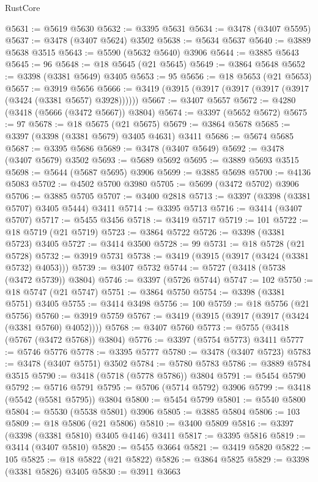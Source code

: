 \begin{lexlean}{RustCore}
\begin{coremodule}
@5631 := @5619 @5630
@5632 := @3395 @5631
@5634 := @3478 (@3407 @5595)
@5637 := @3478 (@3407 @5624) @3502
@5638 := @5634 @5637
@5640 := @3889 @5638 @3515
@5643 := @5590 (@5632 @5640) @3906
@5644 := @3885 @5643
@5645 := 96
@5648 := @18 @5645 (@21 @5645)
@5649 := @3864 @5648
@5652 := @3398 (@3381 @5649) @3405
@5653 := 95
@5656 := @18 @5653 (@21 @5653)
@5657 := @3919 @5656
@5666 := @3419 (@3915 (@3917 (@3917 (@3917 (@3917 (@3424 (@3381 @5657) @3928))))))
@5667 := @3407 @5657
@5672 := @4280 (@3418 (@5666 (@3472 @5667)) @3804)
@5674 := @3397 (@5652 @5672)
@5675 := 97
@5678 := @18 @5675 (@21 @5675)
@5679 := @3864 @5678
@5685 := @3397 (@3398 (@3381 @5679) @3405 @4631) @3411
@5686 := @5674 @5685
@5687 := @3395 @5686
@5689 := @3478 (@3407 @5649)
@5692 := @3478 (@3407 @5679) @3502
@5693 := @5689 @5692
@5695 := @3889 @5693 @3515
@5698 := @5644 (@5687 @5695) @3906
@5699 := @3885 @5698
@5700 := @4136 @5083
@5702 := @4502 @5700 @3980
@5705 := @5699 (@3472 @5702) @3906
@5706 := @3885 @5705
@5707 := @3400 @2818
@5713 := @3397 (@3398 (@3381 @5707) @3405 @5444) @3411
@5714 := @3395 @5713
@5716 := @3414 (@3407 @5707)
@5717 := @5455 @3456
@5718 := @3419 @5717
@5719 := 101
@5722 := @18 @5719 (@21 @5719)
@5723 := @3864 @5722
@5726 := @3398 (@3381 @5723) @3405
@5727 := @3414 @3500
@5728 := 99
@5731 := @18 @5728 (@21 @5728)
@5732 := @3919 @5731
@5738 := @3419 (@3915 (@3917 (@3424 (@3381 @5732) @4053)))
@5739 := @3407 @5732
@5744 := @5727 (@3418 (@5738 (@3472 @5739)) @3804)
@5746 := @3397 (@5726 @5744)
@5747 := 102
@5750 := @18 @5747 (@21 @5747)
@5751 := @3864 @5750
@5754 := @3398 (@3381 @5751) @3405
@5755 := @3414 @3498
@5756 := 100
@5759 := @18 @5756 (@21 @5756)
@5760 := @3919 @5759
@5767 := @3419 (@3915 (@3917 (@3917 (@3424 (@3381 @5760) @4052))))
@5768 := @3407 @5760
@5773 := @5755 (@3418 (@5767 (@3472 @5768)) @3804)
@5776 := @3397 (@5754 @5773) @3411
@5777 := @5746 @5776
@5778 := @3395 @5777
@5780 := @3478 (@3407 @5723)
@5783 := @3478 (@3407 @5751) @3502
@5784 := @5780 @5783
@5786 := @3889 @5784 @3515
@5790 := @3418 (@5718 (@5778 @5786)) @3804
@5791 := @5454 @5790
@5792 := @5716 @5791
@5795 := @5706 (@5714 @5792) @3906
@5799 := @3418 (@5542 (@5581 @5795)) @3804
@5800 := @5454 @5799
@5801 := @5540 @5800
@5804 := @5530 (@5538 @5801) @3906
@5805 := @3885 @5804
@5806 := 103
@5809 := @18 @5806 (@21 @5806)
@5810 := @3400 @5809
@5816 := @3397 (@3398 (@3381 @5810) @3405 @4146) @3411
@5817 := @3395 @5816
@5819 := @3414 (@3407 @5810)
@5820 := @5455 @3664
@5821 := @3419 @5820
@5822 := 105
@5825 := @18 @5822 (@21 @5822)
@5826 := @3864 @5825
@5829 := @3398 (@3381 @5826) @3405
@5830 := @3911 @3663

\end{coremodule}
\end{lexlean}
